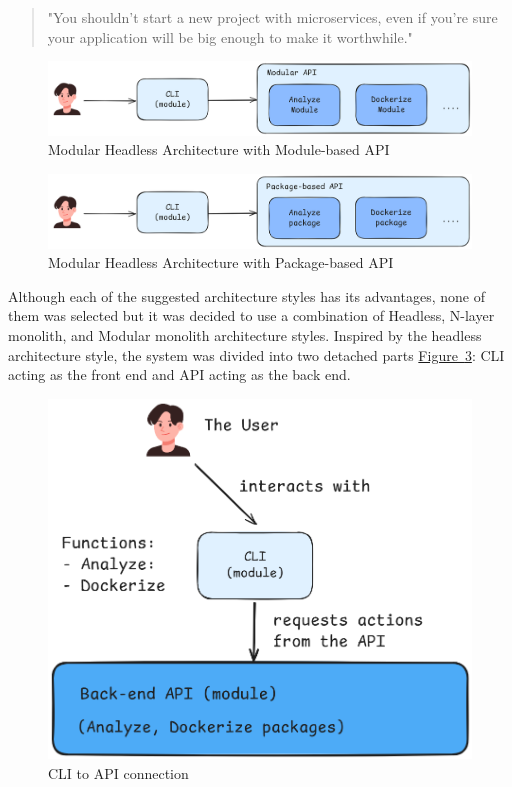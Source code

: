 \documentclass[twocolumn]{article}
\newcommand{\FigRef}[1]{\hyperref[#1]{Figure~\ref{#1}}}
\begin{document}
\begin{quote}
    "You shouldn't start a new project with microservices, even if you're sure your application will be big enough to make it worthwhile."
\end{quote}

\begin{figure}[H]
    \centering
    \includegraphics[width=\linewidth]{images/modular-headless-architecture-level-2.png}
    \caption{Modular Headless Architecture with Module-based API}
    \label{fig:modular-headless-architecture-level-2}
\end{figure}

\begin{figure}[H]
    \centering
    \includegraphics[width=\linewidth]{images/modular-headless-architecture-level-1.png}
    \caption{Modular Headless Architecture with Package-based API}
    \label{fig:modular-headless-architecture-level-1}
\end{figure}

Although each of the suggested architecture styles has its advantages, none of them was selected but it was decided to use a combination of Headless, N-layer monolith, and Modular monolith architecture styles. Inspired by the headless architecture style, the system was divided into two detached parts \FigRef{fig:cli-api-conn}: CLI acting as the front end and API acting as the back end. 

\begin{figure}[H]
    \centering
    \includegraphics[width=\linewidth]{images/cli-api-connection.png}
    \caption{CLI to API connection}
    \label{fig:cli-api-conn}
\end{figure}
\end{document}
